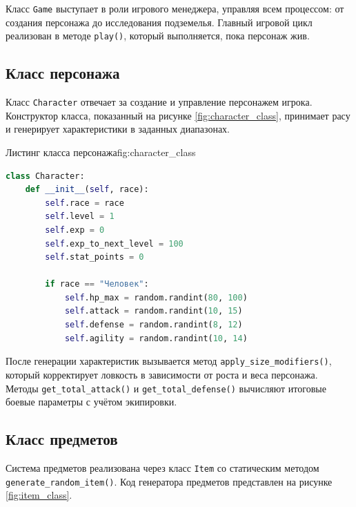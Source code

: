 \documentclass[]{vvsu}
\begin{document}
Класс \texttt{Game} выступает в роли игрового менеджера, управляя всем процессом: от создания персонажа до исследования подземелья. Главный игровой цикл реализован в методе \texttt{play()}, который выполняется, пока персонаж жив.

\subsection{Класс персонажа}

Класс \texttt{Character} отвечает за создание и управление персонажем игрока. Конструктор класса, показанный на рисунке \ref{fig:character_class}, принимает расу и генерирует характеристики в заданных диапазонах.

\begin{vvsu_figure}{Листинг класса персонажа}{fig:character_class}
  \begin{minipage}{.95\textwidth}
    \begin{lstlisting}[language=Python]
class Character:
    def __init__(self, race):
        self.race = race
        self.level = 1
        self.exp = 0
        self.exp_to_next_level = 100
        self.stat_points = 0
        
        if race == "Человек":
            self.hp_max = random.randint(80, 100)
            self.attack = random.randint(10, 15)
            self.defense = random.randint(8, 12)
            self.agility = random.randint(10, 14)
    \end{lstlisting}
  \end{minipage}
\end{vvsu_figure}

После генерации характеристик вызывается метод \texttt{apply\_size\_modifiers()}, который корректирует ловкость в зависимости от роста и веса персонажа. Методы \texttt{get\_total\_attack()} и \texttt{get\_total\_defense()} вычисляют итоговые боевые параметры с учётом экипировки.

\subsection{Класс предметов}

Система предметов реализована через класс \texttt{Item} со статическим методом \texttt{generate\_random\_item()}. Код генератора предметов представлен на рисунке \ref{fig:item_class}.
\end{document}

